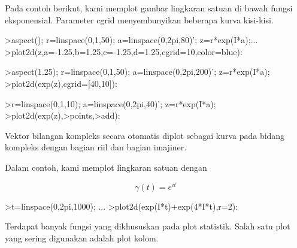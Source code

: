 \documentclass{article}
\begin{document}
\begin{eulernotebook}
\begin{eulercomment}
\begin{eulercomment}
\begin{eulercomment}
\begin{eulercomment}
\begin{eulercomment}
\begin{eulercomment}
\begin{eulercomment}
\begin{eulercomment}
\begin{eulercomment}
\begin{eulercomment}
\begin{eulercomment}
Pada contoh berikut, kami memplot gambar lingkaran satuan di bawah
fungsi eksponensial. Parameter cgrid menyembunyikan beberapa kurva
kisi-kisi.
\end{eulercomment}
\begin{eulerprompt}
>aspect(); r=linspace(0,1,50); a=linspace(0,2pi,80)'; z=r*exp(I*a);...
>plot2d(z,a=-1.25,b=1.25,c=-1.25,d=1.25,cgrid=10,color=blue):
\end{eulerprompt}
\begin{eulerprompt}
>aspect(1.25); r=linspace(0,1,50); a=linspace(0,2pi,200)'; z=r*exp(I*a);
>plot2d(exp(z),cgrid=[40,10]):
\end{eulerprompt}
\begin{eulerprompt}
>r=linspace(0,1,10); a=linspace(0,2pi,40)'; z=r*exp(I*a);
>plot2d(exp(z),>points,>add):
\end{eulerprompt}
\begin{eulercomment}
Vektor bilangan kompleks secara otomatis diplot sebagai kurva pada
bidang kompleks dengan bagian riil dan bagian imajiner.

Dalam contoh, kami memplot lingkaran satuan dengan

\end{eulercomment}
\begin{eulerformula}
\[
\gamma(t) = e^{it}
\]
\end{eulerformula}
\begin{eulerprompt}
>t=linspace(0,2pi,1000); ...
>plot2d(exp(I*t)+exp(4*I*t),r=2):
\end{eulerprompt}
\begin{eulercomment}
Terdapat banyak fungsi yang dikhususkan pada plot statistik. Salah
satu plot yang sering digunakan adalah plot kolom.


\end{eulercomment}
\end{eulercomment}
\end{eulercomment}
\end{eulercomment}
\end{eulercomment}
\end{eulercomment}
\end{eulercomment}
\end{eulercomment}
\end{eulercomment}
\end{eulercomment}
\end{eulercomment}
\end{eulernotebook}
\end{document}
